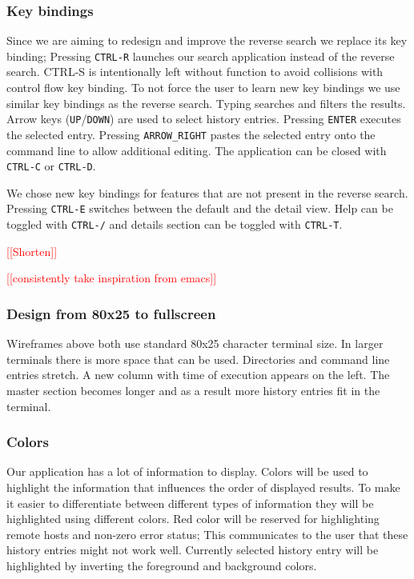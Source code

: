 \documentclass[thesis=M,english]{FITthesis}[2012/10/20]
\newcommand{\redtext}[1]{\textcolor{red}{[[#1]]}}
\begin{document}

\subsubsection{Key bindings}

Since we are aiming to redesign and improve the reverse search we replace its key binding; Pressing \verb|CTRL-R| launches our search application instead of the reverse search. CTRL-S is intentionally left without function to avoid collisions with control flow key binding. %
To not force the user to learn new key bindings we use similar key bindings as the reverse search. Typing searches and filters the results. %
Arrow keys (\verb|UP|/\verb|DOWN|) are used to select history entries. Pressing \verb|ENTER| executes the selected entry. Pressing \verb|ARROW_RIGHT| pastes the selected entry onto the command line to allow additional editing. The application can be closed with \verb|CTRL-C| or \verb|CTRL-D|.

We chose new key bindings for features that are not present in the reverse search.
Pressing \verb|CTRL-E| switches between the default and the detail view.
Help can be toggled with \verb|CTRL-/| and details section can be toggled with \verb|CTRL-T|.

\redtext{Shorten}

\redtext{consistently take inspiration from emacs}

\subsubsection{Design from 80x25 to fullscreen}

Wireframes above both use standard 80x25 character terminal size. In larger terminals there is more space that can be used. Directories and command line entries stretch. A new column with time of execution appears on the left. The master section becomes longer and as a result more history entries fit in the terminal.   

\subsubsection{Colors}

Our application has a lot of information to display. 
Colors will be used to highlight the information that influences the order of displayed results. To make it easier to differentiate between different types of information they will be highlighted using different colors. 
Red color will be reserved for highlighting remote hosts and non-zero error status; This communicates to the user that these history entries might not work well.
Currently selected history entry will be highlighted by inverting the foreground and background colors.
\end{document}
